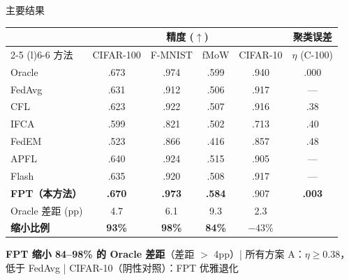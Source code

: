 \documentclass[aspectratio=169,11pt]{ctexbeamer}
\begin{document}
\begin{frame}{主要结果}

\centering
{\small
\setlength{\tabcolsep}{5pt}
\begin{tabular}{@{}l cccc c@{}}
\toprule
& \multicolumn{4}{c}{\textbf{精度} ($\uparrow$)} & \textbf{聚类误差} \\
\cmidrule(lr){2-5} \cmidrule(l){6-6}
方法 & CIFAR-100 & F-MNIST & fMoW & CIFAR-10 & $\eta$ (C-100) \\
\midrule
\textcolor{cOracle}{Oracle} & .673 & .974 & .599 & .940 & .000 \\
FedAvg & .631 & .912 & .506 & .917 & --- \\
\midrule
\textcolor{cA}{CFL} & .623 & .922 & .507 & .916 & \textcolor{cA}{.38} \\
\textcolor{cA}{IFCA} & .599 & .821 & .502 & .713 & \textcolor{cA}{.40} \\
\textcolor{cA}{FedEM} & .523 & .866 & .416 & .857 & \textcolor{cA}{.48} \\
\midrule
APFL & .640 & .924 & .515 & .905 & --- \\
Flash & .635 & .920 & .508 & .917 & --- \\
\midrule
\textcolor{cC}{\textbf{FPT（本方法）}} & \textcolor{cC}{\textbf{.670}} & \textcolor{cC}{\textbf{.973}} & \textcolor{cC}{\textbf{.584}} & .907 & \textcolor{cC}{\textbf{.003}} \\
\midrule
Oracle 差距 (pp) & 4.7 & 6.1 & 9.3 & 2.3 & \\
\textbf{缩小比例} & \textbf{93\%} & \textbf{98\%} & \textbf{84\%} & $-43\%$ & \\
\bottomrule
\end{tabular}
}

\vspace{2pt}
{\small
\textcolor{cC}{\textbf{FPT 缩小 84--98\% 的 Oracle 差距}}（差距 $>$ 4pp）\quad|\quad
\textcolor{cA}{所有方案 A：$\eta \geq 0.38$，低于 FedAvg} \quad|\quad
CIFAR-10（阴性对照）：FPT 优雅退化
}
\end{frame}
\end{document}
